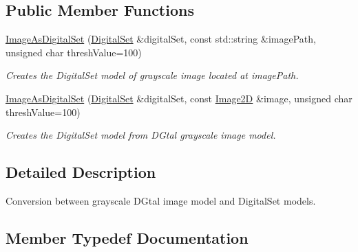 \subsection*{Public Member Functions}
\begin{DoxyCompactItemize}
\item 
\mbox{\hyperlink{structDIPaCUS_1_1Representation_1_1ImageAsDigitalSet_a42e0b9a725f2714763ac461e8941f4c3}{Image\+As\+Digital\+Set}} (\mbox{\hyperlink{structDIPaCUS_1_1Representation_1_1ImageAsDigitalSet_a3a19b478392377afed24a5234dfdbd68}{Digital\+Set}} \&digital\+Set, const std\+::string \&image\+Path, unsigned char thresh\+Value=100)
\begin{DoxyCompactList}\small\item\em Creates the Digital\+Set model of grayscale image located at image\+Path. \end{DoxyCompactList}\item 
\mbox{\hyperlink{structDIPaCUS_1_1Representation_1_1ImageAsDigitalSet_aa59e85beff6b478a59378804a35e58d3}{Image\+As\+Digital\+Set}} (\mbox{\hyperlink{structDIPaCUS_1_1Representation_1_1ImageAsDigitalSet_a3a19b478392377afed24a5234dfdbd68}{Digital\+Set}} \&digital\+Set, const \mbox{\hyperlink{structDIPaCUS_1_1Representation_1_1ImageAsDigitalSet_a594777514834a88dac93cac43b5e9324}{Image2D}} \&image, unsigned char thresh\+Value=100)
\begin{DoxyCompactList}\small\item\em Creates the Digital\+Set model from D\+Gtal grayscale image model. \end{DoxyCompactList}\end{DoxyCompactItemize}


\subsection{Detailed Description}
Conversion between grayscale D\+Gtal image model and Digital\+Set models. 



\subsection{Member Typedef Documentation}
\mbox{\label{structDIPaCUS_1_1Representation_1_1ImageAsDigitalSet_a3a19b478392377afed24a5234dfdbd68}} 
